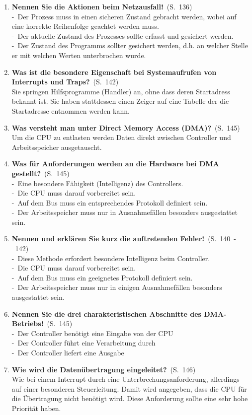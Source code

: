 \documentclass[a4paper,12pt]{article}
\newcommand{\question}[3]{\pagebreak[3]\item {\textbf{#1?}}\ (S.\ #2)#3}
\newcommand{\statement}[3]{\pagebreak[3]\item {\textbf{#1!}}\ (S.\ #2)#3}
\newcommand{\catchword}[1]{\\-\ #1}
\newcommand{\normaltext}[1]{\\#1}
\newcommand{\page}[1]{#1}
\newcommand{\pages}[2]{#1\ -\ #2}
\begin{document}
\begin{enumerate}
  \statement{Nennen Sie die Aktionen beim Netzausfall}{\page{136}}
  {
    \catchword{Der Prozess muss in einen sicheren Zustand gebracht werden, wobei auf eine korrekte
    Reihenfolge geachtet werden muss.}
    \catchword{Der aktuelle Zustand des Prozesses sollte erfasst und gesichert werden.}
    \catchword{Der Zustand des Programms sollter gesichert werden, d.h. an welcher Stelle er mit
    welchen Werten unterbrochen wurde.}
  }
  
  \question{Was ist die besondere Eigenschaft bei Systemaufrufen von Interrupts und Traps}{\page{142}}
  {
    \normaltext{Sie springen Hilfsprogramme (Handler) an, ohne dass deren Startadress bekannt ist.
    Sie haben stattdessen einen Zeiger auf eine Tabelle der die Startadresse entnommen werden kann.}
  }

  \question{Was versteht man unter Direct Memory Access (DMA)}{\page{145}}
  {
    \normaltext{Um die CPU zu entlasten werden Daten direkt zwischen Controller und Arbeitsspeicher
    ausgetauscht.}
  }

  
  \question{Was für Anforderungen werden an die Hardware bei DMA gestellt}{\page{145}}
  {
    \catchword{Eine besondere Fähigkeit (Intelligenz) des Controllers.}
    \catchword{Die CPU muss darauf vorbereitet sein.}
    \catchword{Auf dem Bus muss ein entsprechendes Protokoll definiert sein.}
    \catchword{Der Arbeitsspeicher muss nur in Ausnahmefällen besonders ausgestattet sein.}
  }
  
  \statement{Nennen und erklären Sie kurz die auftretenden Fehler}{\pages{140}{142}}
  {
    \catchword{Diese Methode erfordert besondere Intelligenz beim Controller.}
    \catchword{Die CPU muss darauf vorbereitet sein.}
    \catchword{Auf dem Bus muss ein geeignetes Protokoll definiert sein.}
    \catchword{Der Arbeitsspeicher muss nur in einigen Ausnahmefällen besonders ausgestattet sein.}
  }


  \statement{Nennen Sie die drei charakteristischen Abschnitte des DMA-Betriebs}{\page{145}}
  {
    \catchword{Der Controller benötigt eine Eingabe von der CPU}
    \catchword{Der Controller führt eine Verarbeitung durch}
    \catchword{Der Controller liefert eine Ausgabe}
  }

  \question{Wie wird die Datenübertragung eingeleitet}{\page{146}}
  {
    \normaltext{Wie bei einem Interrupt durch eine Unterbrechungsanforderung, allerdings
                auf einer besonderen Steuerleitung. Damit wird angegeben, dass die CPU
                für die Übertragung nicht benötigt wird. Diese Anforderung sollte eine
                sehr hohe Priorität haben.}
  }


\end{enumerate}
\end{document}
